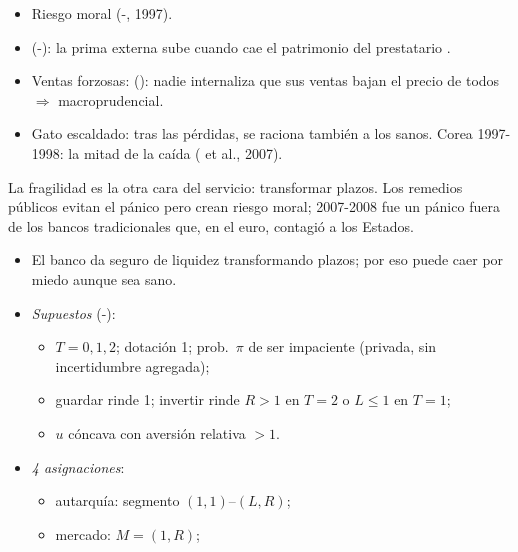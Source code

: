 \documentclass{article}
\begin{document}
\begin{columnas}
\begin{itemize}
\item Riesgo moral (-, 1997).
\item {} (-): la prima externa sube cuando cae el patrimonio del prestatario .
\item Ventas forzosas:  (): nadie internaliza que sus ventas bajan el precio de todos $\Rightarrow$ macroprudencial.
\item Gato escaldado: tras las pérdidas, se raciona también a los sanos. Corea 1997-1998: la mitad de la caída ( et al., 2007).
\end{itemize}

\begin{ideaclave}
La fragilidad es la otra cara del servicio: transformar plazos. Los remedios públicos evitan el pánico pero crean riesgo moral; 2007-2008 fue un pánico fuera de los bancos tradicionales que, en el euro, contagió a los Estados.
\end{ideaclave}
\begin{itemize}
\item El banco da seguro de liquidez transformando plazos; por eso puede caer por miedo aunque sea sano.
\end{itemize}
\begin{itemize}
\item \emph{Supuestos} (-):
  \begin{itemize}
  \item $T=0,1,2$; dotación 1; prob.\ $\pi$ de ser impaciente (privada, sin incertidumbre agregada);
  \item guardar rinde 1; invertir rinde $R>1$ en $T=2$ o $L\leq1$ en $T=1$;
  \item $u$ cóncava con aversión relativa $>1$.
  \end{itemize}
\item \emph{4 asignaciones}:
  \begin{itemize}
  \item autarquía: segmento $(1,1)$–$(L,R)$;
  \item mercado: $M=(1,R)$;

\end{itemize}
\end{itemize}
\end{columnas}
\end{document}

